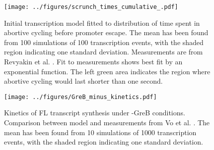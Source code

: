 \begin{figure}
    \begin{center}
      \texttt{[image: ../figures/scrunch\_times\_cumulative\_.pdf]}
    \end{center}
    \caption{Initial transcription model fitted to distribution of time spent
      in abortive cycling before promoter escape. The mean has been found from
      100 simulations of 100 transcription events, with the shaded region
      indicating one standard deviation. Measurements are
      from Revyakin et al. \cite{revyakin_abortive_2006}. Fit to measurements
      shows best fit by an exponential function. The left green area indicates
      the region where abortive cycling would last shorter than one second.}
\label{fig:revyakin_fit}
\end{figure}


\begin{figure}
    \begin{center}
        \texttt{[image: ../figures/GreB\_minus\_kinetics.pdf]}
    \end{center}
    \caption{Kinetics of FL transcript synthesis under -GreB conditions.
      Comparison between model and measurements from Vo
      et al. \cite{vo_vitro_2003-1}. The mean has been found from 10
      simulations of 1000 transcription events, with the shaded region
      indicating one standard deviation.}
\label{fig:vo_comparison}
\end{figure}

